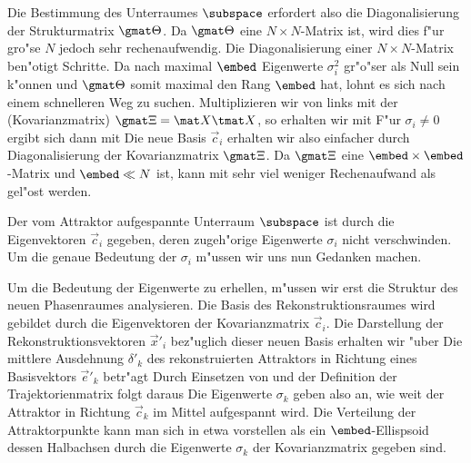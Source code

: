 Die Bestimmung des Unterraumes $\subspace$ erfordert also die
Diagonalisierung der Strukturmatrix $\gmat \Theta$. Da $\gmat \Theta$
eine $N\times N$-Matrix ist, wird dies f"ur gro"se $N$ jedoch
sehr rechenaufwendig. Die Diagonalisierung einer $N\times N$-Matrix ben"otigt 
Schritte. 
 Da nach  maximal $\embed$ Eigenwerte
$\sigma_i^2$ gr"o"ser als Null sein k"onnen und $\gmat \Theta$ somit maximal den Rang
$\embed$ hat, lohnt es sich nach einem schnelleren Weg zu suchen. 
Multiplizieren wir  von links mit der
\begriff(Kovarianzmatrix) $\gmat \Xi = \mat X \tmat X$, so erhalten wir mit 
F"ur $\sigma_i\neq 0$ ergibt sich dann mit  
Die neue Basis $\vec c_i$ erhalten wir  
also einfacher durch Diagonalisierung der Kovarianzmatrix $\gmat \Xi$. Da $\gmat \Xi$ eine
$\embed\times\embed$-Matrix und $\embed\ll N$ ist, kann  mit sehr viel
weniger Rechenaufwand als  gel"ost werden.

Der vom Attraktor aufgespannte Unterraum $\subspace$ ist durch die Eigenvektoren $\vec
c_i$ gegeben, deren zugeh"orige Eigenwerte $\sigma_i$ nicht verschwinden. Um die genaue
Bedeutung der $\sigma_i$ m"ussen wir uns nun Gedanken machen.

Um die Bedeutung der Eigenwerte zu erhellen, m"ussen wir erst die Struktur des neuen
Phasenraumes analysieren. Die Basis des Rekonstruktionsraumes wird gebildet durch die
Eigenvektoren der Kovarianzmatrix $\vec c_i$. Die Darstellung der Rekonstruktionsvektoren
$\vec x'_i$ bez"uglich dieser neuen Basis erhalten wir "uber
Die mittlere Ausdehnung $\delta'_k$ des rekonstruierten Attraktors in Richtung eines Basisvektors
$\vec e'_k$ betr"agt
Durch Einsetzen von  und der Definition der Trajektorienmatrix folgt daraus
Die Eigenwerte $\sigma_k$ geben also an, wie weit der Attraktor in Richtung $\vec c_k$
im Mittel aufgespannt wird. Die Verteilung der Attraktorpunkte kann man sich in etwa vorstellen als ein
$\embed$-Ellispsoid dessen Halbachsen durch die Eigenwerte $\sigma_k$ der Kovarianzmatrix
gegeben sind. 

